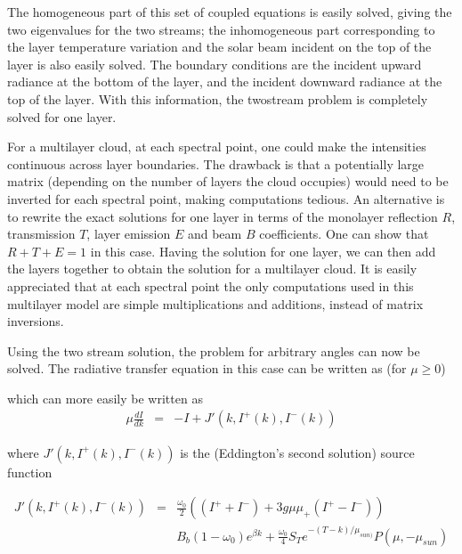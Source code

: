 \documentclass[11pt]{article}
\begin{document}
The homogeneous part of this set of coupled equations is easily solved, giving
the two eigenvalues for the two streams; the inhomogeneous part corresponding 
to the layer temperature variation and the solar beam incident on the top of 
the layer is also easily solved. The boundary conditions are the incident
upward radiance at the bottom of the layer, and the incident downward 
radiance at the top of the layer. With this information, the twostream 
problem is completely solved for one layer.

For a multilayer cloud, at each spectral point, one could make the intensities
continuous across layer boundaries. The drawback is that a potentially large 
matrix (depending on the number of layers the cloud occupies) would need to 
be inverted for each spectral point, making computations tedious. An 
alternative is to rewrite the exact solutions for one layer in terms of the 
monolayer reflection $R$, transmission $T$, layer 
emission $E$ and beam $B$ coefficients. One can show that $R+T+E = 1$ in this 
case. Having the solution for one layer, we can then add the layers together 
to obtain the solution for a multilayer cloud. It is easily appreciated 
that at each spectral point the only computations used in this multilayer 
model are simple multiplications and additions, instead of matrix inversions.

Using the two stream solution, the problem for arbitrary angles can now be 
solved. The radiative transfer equation in this case can be written as 
(for $\mu \geq 0$)

which can more easily be written as 
\[
\begin{array}{ccc}
\mu \frac{dI}{dk} & = & -I + J\prime(k,I^{+}(k),I^{-}(k))
\end{array}
\]

where $J\prime(k,I^{+}(k),I^{-}(k))$ is the (Eddington's second 
solution) source function

\[
\begin{array}{ccc}
J\prime(k,I^{+}(k),I^{-}(k)) & = & \frac{\omega_{0}}{2} \left(
(I^{+} + I^{-}) + 3g\mu \mu_{+}(I^{+} - I^{-}) \right) \\
                             & & B_{b}(1-\omega_{0})e^{\beta k} + 
\frac{\omega_{0}}{4}S_{T}e^{-(T-k)/\mu_{sun)}}P(\mu,-\mu_{sun}) \\
\end{array}
\]
\end{document}
